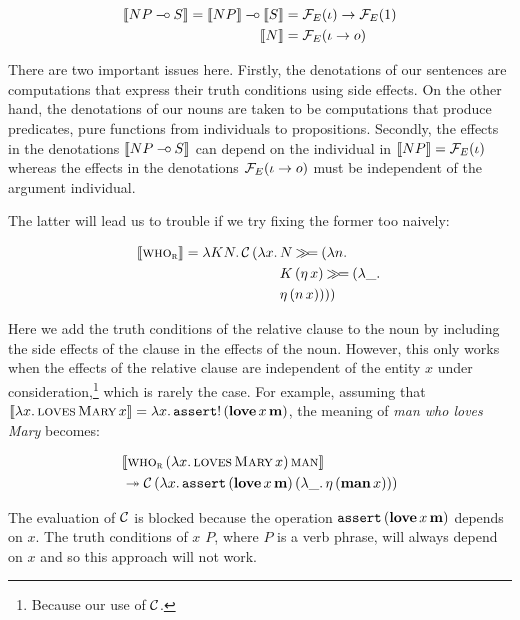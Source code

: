 \begin{align*}
  \llbracket NP \mathbin{{-}\mkern-3.5mu{\circ}} S \rrbracket = \llbracket NP \rrbracket \mathbin{{-}\mkern-3.5mu{\circ}} \llbracket S \rrbracket &= \mathcal{F}_E(\iota) \to \mathcal{F}_E(1) \\
  \llbracket N \rrbracket &= \mathcal{F}_E(\iota \to o)
\end{align*}

There are two important issues here. Firstly, the denotations of our
sentences are computations that express their truth conditions using side
effects. On the other hand, the denotations of our nouns are taken to be
computations that produce predicates, pure functions from individuals to
propositions. Secondly, the effects in the denotations $\llbracket NP \mathbin{{-}\mkern-3.5mu{\circ}} S \rrbracket$
can depend on the individual in $\llbracket NP \rrbracket = \mathcal{F}_E(\iota)$ whereas the
effects in the denotations $\mathcal{F}_E(\iota \to o)$ must be independent of the
argument individual.

The latter will lead us to trouble if we try fixing the former too naively:

\begin{align*}
  \llbracket \textsc{who}_{\textsc{r}} \rrbracket = \lambda K N.\, \mathcal{C}\,(\lambda x.\, 
    &N \mathbin{\gg\!=} (\lambda n.\,  \\
    &K\,(\eta\,x) \mathbin{\gg\!=} (\lambda \_.\,  \\
    &\eta\,(n\,x))))
\end{align*}

Here we add the truth conditions of the relative clause to the noun by
including the side effects of the clause in the effects of the
noun. However, this only works when the effects of the relative clause are
independent of the entity $x$ under consideration,\footnote{Because our use
  of $\mathcal{C}$.} which is rarely the case. For example, assuming that
$\llbracket \lambda x.\, \textsc{loves}\,\textsc{Mary}\,x \rrbracket =
\lambda x.\, \mathtt{assert}!\,(\textbf{love}\,x\,\textbf{m})$, the meaning of
\emph{man who loves Mary} becomes:

\begin{align*}
& \llbracket \textsc{who}_{\textsc{r}}\,(\lambda x.\, \textsc{loves}\,\textsc{Mary}\,x)\,\textsc{man} \rrbracket \\
& \twoheadrightarrow \mathcal{C}\,(\lambda x.\, \mathtt{assert}\,(\textbf{love}\,x\,\textbf{m})\,(\lambda \_.\, \eta\,(\textbf{man}\,x)))
\end{align*}

The evaluation of $\mathcal{C}$ is blocked because the operation
$\mathtt{assert}\,(\textbf{love}\,x\,\textbf{m})$ depends on $x$. The
truth conditions of \emph{$x$ $P$}, where $P$ is a verb phrase, will always
depend on $x$ and so this approach will not work.

